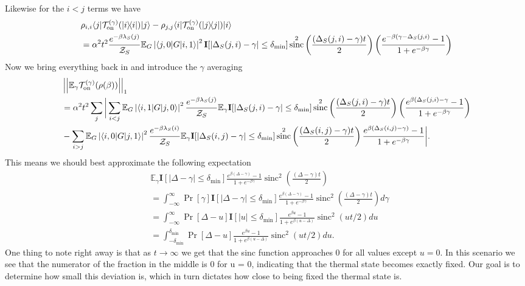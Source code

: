 \documentclass[
 amsmath,amssymb,
 aps,
onecolumn, 
nofootinbib]{revtex4-2}
\newcommand{\on}{\rm on}
\newcommand{\ket}[1]{|#1\rangle}
\newcommand{\bra}[1]{\langle #1|}
\newcommand{\ketbra}[2]{| #1\rangle\! \langle #2|}
\newcommand{\abs}[1]{\left| #1 \right|}
\newcommand{\norm}[1]{\left|\left| #1 \right|\right|}
\newcommand{\EE}{\mathbb{E}}
\newcommand{\partfun}{\mathcal{Z}}
\DeclareMathOperator{\sinc}{sinc}
\begin{document}
Likewise for the $i < j$ terms we have
\begin{align}
    &\rho_{i,i} \bra{j}\mathcal{T}_{\on}^{(\gamma)} (\ketbra{i}{i}) \ket{j} - \rho_{j,j} \bra{i}\mathcal{T}_{\on}^{(\gamma)}(\ketbra{j}{j}) \ket{i} \nonumber \\
    &= \alpha^2 t^2 \frac{e^{-\beta \lambda_S (j)}}{\partfun_S} \EE_G \abs{\bra{j,0} G \ket{i, 1}}^2 \mathbf{I}[\abs{\Delta_S(j,i) - \gamma} \le \delta_{\min}] \sinc^2\left(\frac{(\Delta_S(j,i) - \gamma) t}{2}\right) \left(\frac{e^{-\beta (\gamma - \Delta_S(j,i)} - 1}{1 + e^{-\beta \gamma}} \right)
\end{align}
Now we bring everything back in and introduce the $\gamma$ averaging
\begin{align}
    &\norm{\EE_\gamma \mathcal{T}_{\on}^{(\gamma)}(\rho(\beta))}_1 \\
    &=\alpha^2 t^2 \sum_{j} \bigg|\sum_{i <j} \EE_G \abs{\bra{i, 1}G\ket{j,0}}^2 \frac{e^{-\beta \lambda_S(j)}}{\partfun_S} \EE_\gamma  \mathbf{I}[\abs{\Delta_S(j,i) - \gamma} \le \delta_{\min}] \sinc^2\left(\frac{(\Delta_S(j,i) - \gamma) t}{2}\right) \left(\frac{e^{\beta ( \Delta_S(j,i) - \gamma} - 1}{1 + e^{-\beta \gamma}} \right) \\
    &- \sum_{i > j} \EE_G \abs{\bra{i,0} G \ket{j,1}}^2 \frac{e^{-\beta \lambda_S(i)}}{\partfun_S} \EE_\gamma \mathbf{I}[\abs{\Delta_S(i,j) - \gamma} \le \delta_{\min}] \sinc^2\left(\frac{(\Delta_S(i,j) - \gamma) t}{2} \right) \frac{ e^{\beta (\Delta_S(i,j) - \gamma)} - 1}{1 + e^{-\beta \gamma}}\bigg|.
\end{align}
This means we should best approximate the following expectation
\begin{align}
    &\EE_\gamma \mathbf{I}[\abs{\Delta - \gamma} \le \delta_{\min}] \frac{e^{\beta (\Delta - \gamma)} - 1}{1 + e^{-\beta \gamma}} \sinc^2 \left(\frac{(\Delta - \gamma)t}{2}\right) \\ 
    &= \int_{-\infty}^{\infty} \Pr[\gamma] \mathbf{I}[\abs{\Delta - \gamma} \le \delta_{\min}] \frac{e^{\beta (\Delta - \gamma)} - 1}{1 + e^{-\beta \gamma}} \sinc^2 \left(\frac{(\Delta - \gamma)t}{2}\right) d \gamma \\
    &= \int_{-\infty}^{\infty} \Pr[\Delta - u] \mathbf{I}[\abs{u} \le \delta_{\min}] \frac{ e^{\beta u} - 1}{1 + e^{\beta (u - \Delta)}} \sinc^2(u t / 2) du \\
    &= \int_{-\delta_{\min}}^{\delta_{\min}} \Pr[\Delta - u] \frac{ e^{\beta u}  - 1}{1 + e^{\beta (u - \Delta)}} \sinc^2(u t / 2) du.
\end{align}
One thing to note right away is that as $t \to \infty$ we get that the sinc function approaches 0 for all values except $u = 0$. In this scenario we see that the numerator of the fraction in the middle is 0 for u = 0, indicating that the thermal state becomes exactly fixed. Our goal is to determine how small this deviation is, which in turn dictates how close to being fixed the thermal state is. 
\end{document}
